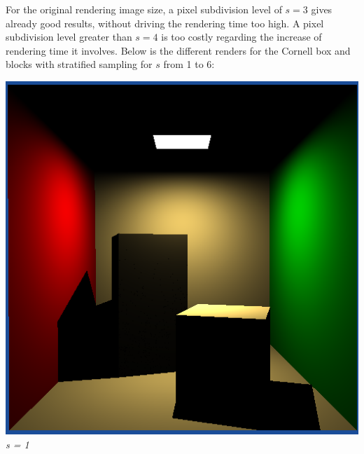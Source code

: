 \documentclass[a4,12pt]{article}
\begin{document}
	For the original rendering image size, a pixel subdivision level of $s = 3$ gives already good results, without driving the rendering time too high. A pixel subdivision level greater than $s = 4$ is too costly regarding the increase of rendering time it involves. Below is the different renders for the Cornell box and blocks with stratified sampling for $s$ from 1 to 6:
	
	
	\begin{center}
		\begin{minipage}[b]{0.40\linewidth}
			\begin{center}
				\includegraphics[width = \textwidth]{./Worksheet6/cornellblocks1.png}\\
				\textit{s = 1}
			\end{center}
		\end{minipage}
		\hspace{0.05\linewidth}
		\begin{minipage}[b]{0.40\linewidth}
			\begin{center}

\end{center}
\end{minipage}
\end{center}
\end{document}
